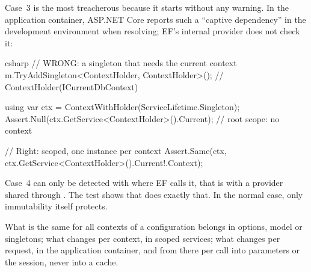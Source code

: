 Case~3 is the most treacherous because it starts without any warning. In the application
container, ASP.NET Core reports such a “captive dependency” in the development environment
when resolving; EF's internal provider does not check it:

\begin{sourcecode}{csharp}
// WRONG: a singleton that needs the current context
m.TryAddSingleton<ContextHolder, ContextHolder>();     // ContextHolder(ICurrentDbContext)

using var ctx = ContextWithHolder(ServiceLifetime.Singleton);
Assert.Null(ctx.GetService<ContextHolder>().Current);  // root scope: no context

// Right: scoped, one instance per context
Assert.Same(ctx, ctx.GetService<ContextHolder>().Current!.Context);
\end{sourcecode}

Case~4 can only be detected with 
where EF calls it, that is with a provider shared through
. The test
shows that  does exactly that. In
the normal case, only immutability itself protects.

\begin{important}
  What is the same for all contexts of a configuration belongs in options, model or
  singletons; what changes per context, in scoped services; what changes per request, in the
  application container, and from there per call into parameters or the session, never into
  a cache.
\end{important}
